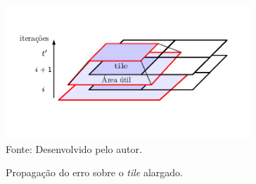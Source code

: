 \begin{figure}[t]
  \begin{minipage}[b]{0.9\textwidth}
	\centering
    \caption{Propagação do erro sobre o \textit{tile} alargado.}
    \includegraphics[height=5cm]{figs/tilingProp.pdf} \\
    Fonte: Desenvolvido pelo autor.
    \label{fig:errorPropagation}
  \end{minipage}
\end{figure}


%


